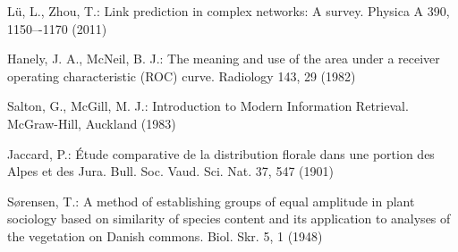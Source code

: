 \documentclass{llncs}
\begin{document}
%

%
%
\begin{thebibliography}{}
%
%
%
%
%

L{\"u}, L., Zhou, T.:
Link prediction in complex networks: A survey.
Physica A 390, 1150–-1170 (2011)

Hanely, J. A., McNeil, B. J.:
The meaning and use of the area under a receiver operating characteristic (ROC) curve.
Radiology 143, 29 (1982)

Salton, G., McGill, M. J.:
Introduction to Modern Information Retrieval.
McGraw-Hill, Auckland (1983)

Jaccard, P.:
{\'E}tude comparative de la distribution florale dans une portion des Alpes et des Jura.
Bull. Soc. Vaud. Sci. Nat. 37, 547 (1901)

S{\o}rensen, T.: 
A method of establishing groups of equal amplitude in plant sociology based on similarity of species content and its application to analyses of the vegetation on Danish commons.
Biol. Skr. 5, 1 (1948)


\end{thebibliography}
\end{document}
